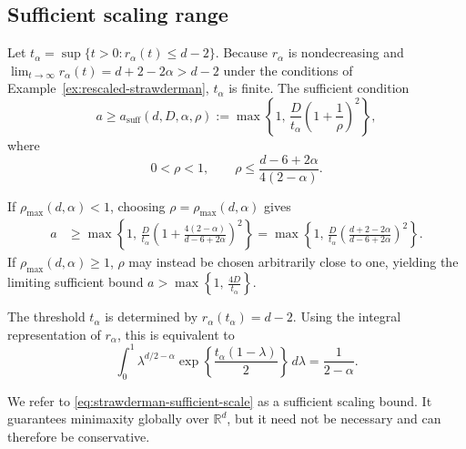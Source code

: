 \documentclass[11pt]{article}
\theoremstyle{definition}
\begin{document}
\subsection{Sufficient scaling range}
\label{subsec:sufficient-scaling}

Let $t_\alpha
=
\sup\{t>0:r_\alpha(t)\leq d-2\}.$ Because $r_\alpha$ is nondecreasing and $\lim_{t\to\infty}r_\alpha(t)
= d+2-2\alpha>d-2$ under the conditions of Example~\ref{ex:rescaled-strawderman},
$t_\alpha$ is finite. The sufficient condition
\[
a
\geq
a_{\mathrm{suff}}(d,D,\alpha,\rho)
:=
\max\left\{
1,\,
\frac{D}{t_\alpha}
\left(1+\frac1\rho\right)^2
\right\},
\]
where
\[
0<\rho<1,
\qquad
\rho\leq
\frac{d-6+2\alpha}{4(2-\alpha)}.
\]

If $\rho_{\max}(d,\alpha)<1$, choosing
$\rho=\rho_{\max}(d,\alpha)$ gives
\begin{align}
a
&\geq
\max\left\{
1,\,
\frac{D}{t_\alpha}
\left(
1+
\frac{4(2-\alpha)}
     {d-6+2\alpha}
\right)^2
\right\}
=
\max\left\{
1,\,
\frac{D}{t_\alpha}
\left(
\frac{d+2-2\alpha}
     {d-6+2\alpha}
\right)^2
\right\}.
\label{eq:strawderman-sufficient-scale}
\end{align}
If $\rho_{\max}(d,\alpha)\geq1$, $\rho$ may instead be chosen
arbitrarily close to one, yielding the limiting sufficient bound $a
>
\max\left\{
1,\,
\frac{4D}{t_\alpha}
\right\}.$ 

The threshold $t_\alpha$ is determined by $r_\alpha(t_\alpha)=d-2.$ Using the integral representation of $r_\alpha$, this is equivalent
to
\[
\int_0^1
\lambda^{d/2-\alpha}
\exp\left\{
\frac{t_\alpha(1-\lambda)}{2}
\right\}
\,d\lambda
=
\frac{1}{2-\alpha}.
\]

We refer to
\eqref{eq:strawderman-sufficient-scale} as a sufficient scaling bound. It guarantees minimaxity globally
over $\mathbb{R}^d$, but it need not be necessary and can therefore be conservative.
\end{document}
